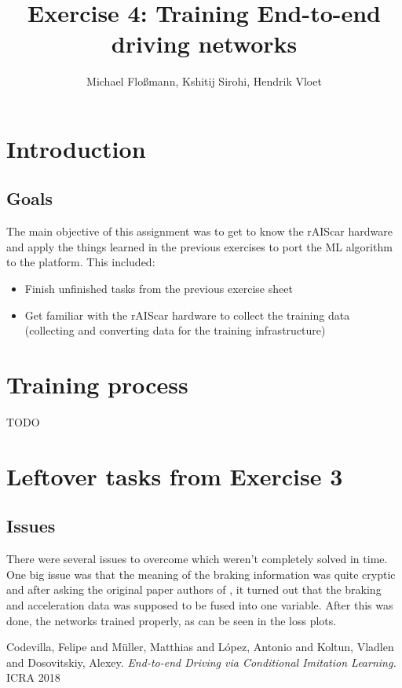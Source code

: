 \documentclass[a4paper]{article}
\title{Exercise 4: Training End-to-end driving networks}
\author{Michael Floßmann, Kshitij Sirohi, Hendrik Vloet}
\begin{document}
\maketitle

\section{Introduction}
\subsection{Goals}
The main objective of this assignment was to get to know the rAIScar hardware
and apply the things learned in the previous exercises to port the ML algorithm
to the platform. This included:
\begin{itemize}
\item Finish unfinished tasks from the previous exercise sheet
\item Get familiar with the rAIScar hardware to collect the training data
  (collecting and converting data for the training infrastructure)
\end{itemize} 

\section{Training process}
TODO

\section{Leftover tasks from Exercise 3}

\subsection{Issues}
There were several issues to overcome which weren't completely solved in time.
One big issue was that the meaning of the braking information was quite cryptic
and after asking the original paper authors of \cite{imitation}, it turned out
that the braking and acceleration data was supposed to be fused into one
variable. After this was done, the networks trained properly, as can be seen in
the loss plots.  %


	
\begin{thebibliography}{9}
Codevilla, Felipe and Müller, Matthias and López, Antonio and Koltun, Vladlen
and Dosovitskiy, Alexey.
\textit{End-to-end Driving via Conditional Imitation Learning.}
ICRA 2018
\end{thebibliography}
\end{document}
